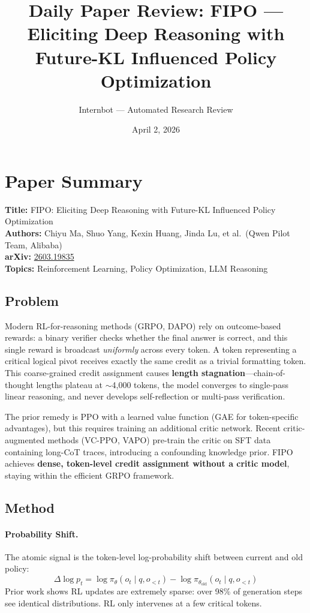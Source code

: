\documentclass[11pt]{article}
\title{Daily Paper Review: FIPO --- Eliciting Deep Reasoning with\\Future-KL Influenced Policy Optimization}
\author{Internbot --- Automated Research Review}
\date{April 2, 2026}
\begin{document}
\maketitle

\section{Paper Summary}

\textbf{Title:} FIPO: Eliciting Deep Reasoning with Future-KL Influenced Policy Optimization \\
\textbf{Authors:} Chiyu Ma, Shuo Yang, Kexin Huang, Jinda Lu, et al.\ (Qwen Pilot Team, Alibaba) \\
\textbf{arXiv:} \href{https://arxiv.org/abs/2603.19835}{2603.19835} \\
\textbf{Topics:} Reinforcement Learning, Policy Optimization, LLM Reasoning

\subsection{Problem}

Modern RL-for-reasoning methods (GRPO, DAPO) rely on outcome-based rewards: a binary verifier checks whether the final answer is correct, and this single reward is broadcast \textit{uniformly} across every token. A token representing a critical logical pivot receives exactly the same credit as a trivial formatting token. This coarse-grained credit assignment causes \textbf{length stagnation}---chain-of-thought lengths plateau at $\sim$4,000 tokens, the model converges to single-pass linear reasoning, and never develops self-reflection or multi-pass verification.

The prior remedy is PPO with a learned value function (GAE for token-specific advantages), but this requires training an additional critic network. Recent critic-augmented methods (VC-PPO, VAPO) pre-train the critic on SFT data containing long-CoT traces, introducing a confounding knowledge prior. FIPO achieves \textbf{dense, token-level credit assignment without a critic model}, staying within the efficient GRPO framework.

\subsection{Method}

\paragraph{Probability Shift.}
The atomic signal is the token-level log-probability shift between current and old policy:
\begin{equation}
\Delta \log p_t = \log \pi_\theta(o_t \mid q, o_{<t}) - \log \pi_{\theta_{\mathrm{old}}}(o_t \mid q, o_{<t})
\end{equation}
Prior work shows RL updates are extremely sparse: over 98\% of generation steps see identical distributions. RL only intervenes at a few critical tokens.
\end{document}
